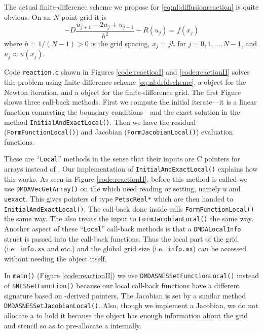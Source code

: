The actual finite-difference scheme we propose for \eqref{eq:nl:diffusionreaction} is quite obvious.  On an $N$ point grid it is
\begin{equation}
- D \frac{u_{j+1} - 2 u_j + u_{j-1}}{h^2} - R(u_j) = f(x_j)   \label{eq:nl:drfdscheme}
\end{equation}
where $h=1/(N-1)>0$ is the grid spacing, $x_j = j h$ for $j=0,1,\dots,N-1$, and $u_j \approx u(x_j)$.

Code \texttt{reaction.c} shown in Figures \ref{code:reactionI} and \ref{code:reactionII} solves this problem using finite-difference scheme \eqref{eq:nl:drfdscheme}, a \pSNES object for the Newton iteration, and a \pDMDA object for the finite-difference grid.  The first Figure shows three call-back methods.  First we compute the initial iterate---it is a linear function connecting the boundary conditions---and the exact solution in the method \texttt{InitialAndExactLocal()}.  Then we have the residual (\texttt{FormFunctionLocal()}) and Jacobian (\texttt{FormJacobianLocal()}) evaluation functions.

These are ``\texttt{Local}'' methods in the sense that their inputs are C pointers for arrays instead of \pVecs.  Our implementation of \texttt{InitialAndExactLocal()} explains how this works.  As seen in Figure \ref{code:reactionII}, before this method is called we use \texttt{DMDAVecGetArray()} on the \pVecs which need reading or setting, namely \texttt{u} and \texttt{uexact}.  This gives pointers of type \texttt{PetscReal*} which are then handed to \texttt{InitialAndExactLocal()}.  The call-back done inside \pSNES calls \texttt{FormFunctionLocal()} the same way.  The \pSNES also treats the input to  \texttt{FormJacobianLocal()} the same way.  Another aspect of these ``\texttt{Local}'' call-back methods is that a \texttt{DMDALocalInfo} struct is passed into the call-back functions.  Thus the local part of the grid (i.e.~\texttt{info.xs} and etc.) and the global grid size (i.e.~\texttt{info.mx}) can be accessed without needing the \pDMDA object itself.

In \texttt{main()} (Figure \ref{code:reactionII}) we use \texttt{DMDASNESSetFunctionLocal()} instead of \texttt{SNESSetFunction()} because our local call-back functions have a different signature based on \pDMDA-derived pointers,   The Jacobian is set by a similar method \texttt{DMDASNESSetJacobianLocal()}.  Also, though we implement a Jacobian, we do not allocate a \pMat to hold it because the \pDMDA object has enough information about the grid and stencil so as to pre-allocate a \pMat internally.

